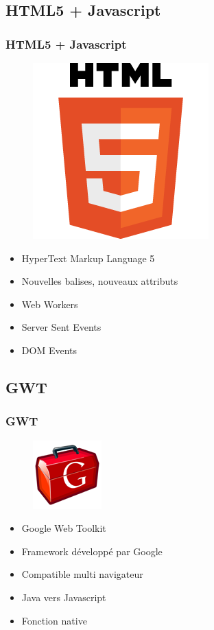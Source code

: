   \subsection*{HTML5 + Javascript}
    \begin{frame}
      \frametitle{HTML5 + Javascript}
	  \begin{figure}
		\center
		\includegraphics[scale=0.40]{html5}
	  \end{figure}
      \begin{itemize}
        \item HyperText Markup Language 5
        \item Nouvelles balises, nouveaux attributs
        \item<2->Web Workers
        \item<3->Server Sent Events
        \item<4->DOM Events
      \end{itemize}
    \end{frame}

  \subsection*{GWT}
    \begin{frame}
      \frametitle{GWT}
      \begin{figure}
		\center
		\includegraphics[scale=0.60]{gwt-logo}
	  \end{figure}
      \begin{itemize}
        \item Google Web Toolkit
        \item Framework développé par Google
        \item<2->Compatible multi navigateur
        \item<3-> Java vers Javascript
        \item<4->Fonction native 
      \end{itemize}
    \end{frame}

